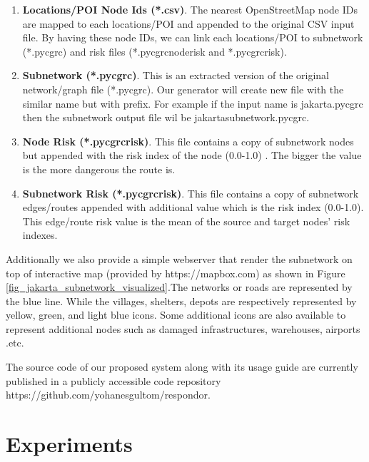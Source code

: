 \documentclass[conference]{IEEEtran}
\begin{document}
\begin{enumerate}

\item \textbf{Locations/POI Node Ids (*.csv)}. The nearest OpenStreetMap node IDs are mapped to each locations/POI and appended to the original CSV input file. By having these node IDs, we can link each locations/POI to subnetwork (*.pycgrc) and risk files (*.pycgrc\textunderscore node\textunderscore risk and *.pycgrc\textunderscore risk).

\item \textbf{Subnetwork (*.pycgrc)}. This is an extracted version of the original network/graph file (*.pycgrc). Our generator will create new file with the similar name but with prefix. For example if the input name is jakarta.pycgrc then the subnetwork output file wil be jakarta\textunderscore subnetwork.pycgrc.

\item \textbf{Node Risk (*.pycgrc\textunderscore risk)}. This file contains a copy of subnetwork nodes but appended with the risk index of the node (0.0-1.0) . The bigger the value is the more dangerous the route is.

\item \textbf{Subnetwork Risk (*.pycgrc\textunderscore risk)}. This file contains a copy of subnetwork edges/routes appended with additional value which is the risk index (0.0-1.0). This edge/route risk value is the mean of the source and target nodes' risk indexes.

\end{enumerate}

Additionally we also provide a simple webserver that render the subnetwork on top of interactive map (provided by https://mapbox.com) as shown in Figure \ref{fig_jakarta_subnetwork_visualized}.The networks or roads are represented by the blue line. While the villages, shelters, depots are respectively represented by yellow, green, and light blue icons. Some additional icons are also available to represent additional nodes such as damaged infrastructures, warehouses, airports .etc.

The source code of our proposed system along with its usage guide are currently published in a publicly accessible code repository https://github.com/yohanesgultom/respondor.


\section{Experiments}
\end{document}
